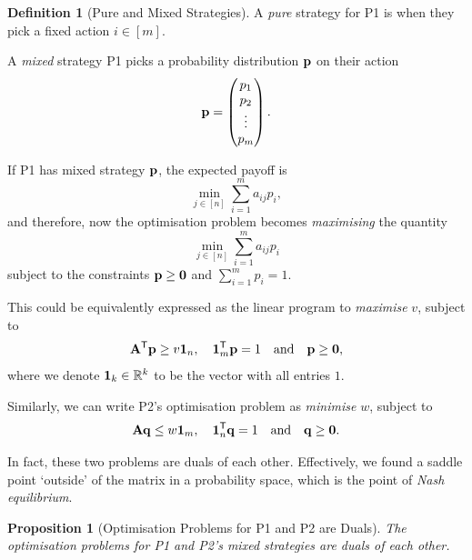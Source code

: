\documentclass[11pt]{article}
\newtheorem{proposition}[theorem]{Proposition}
\theoremstyle{definition}
\newtheorem{definition}[theorem]{Definition}
\theoremstyle{remark}
\newcommand{\bqty}[1]{\left[#1\right]}
\newcommand{\RR}{\mathbb{R}}
\newcommand{\transpose}{^{\mathsf{T}}}
\newcommand{\qand}{\quad\text{and}\quad}
\begin{document}
\begin{definition}[Pure and Mixed Strategies]\label{optim-unit-0060}
    A \emph{pure} strategy for P1 is when they pick a fixed action \(i \in \bqty{m}\).

    A \emph{mixed} strategy P1 picks a probability distribution \(\vb{p}\) on their action
    \[
        \vb{p} = \begin{pmatrix}
            p_1 \\ p_2 \\ \vdots \\ p_m
        \end{pmatrix}.
    \]
\end{definition}

If P1 has mixed strategy \(\vb{p}\), the expected payoff is
\[
    \min_{j \in \bqty{n}} \sum_{i = 1}^{m} a_{ij} p_i,
\]
and therefore, now the optimisation problem becomes \emph{maximising} the quantity
\[
    \min_{j \in \bqty{n}} \sum_{i = 1}^{m} a_{ij} p_i
\]
subject to the constraints \(\vb{p} \geq \vb{0}\) and \(\sum_{i = 1}^{m} p_i = 1\).

This could be equivalently expressed as the linear program to \emph{maximise} \(v\), subject to
\[
    \vb{A}\transpose \vb{p} \geq v \vb{1}_n, \quad \vb{1}_m\transpose \vb{p} = 1 \qand \vb{p} \geq \vb{0},
\]
where we denote \(\vb{1}_{k} \in \RR^k\) to be the vector with all entries \(1\).

Similarly, we can write P2's optimisation problem as \emph{minimise} \(w\), subject to
\[
    \vb{A} \vb{q} \leq w \vb{1}_m, \quad \vb{1}_n\transpose \vb{q} = 1 \qand \vb{q} \geq \vb{0}.
\]

In fact, these two problems are duals of each other. Effectively, we found a saddle point `outside' of the matrix in a probability space, which is the point of \emph{Nash equilibrium}.

\begin{proposition}[Optimisation Problems for P1 and P2 are Duals]\label{optim-unit-0061}
    The optimisation problems for P1 and P2's mixed strategies are duals of each other.
\end{proposition}
\end{document}
